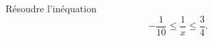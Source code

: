 
\begin{exercice}\label{exosmath-0276}

    Résoudre l'inéquation
    \begin{equation}
        -\frac{1}{ 10 }\leq \frac{1}{ x }\leq\frac{ 3 }{ 4 }.
    \end{equation}

\end{exercice}
